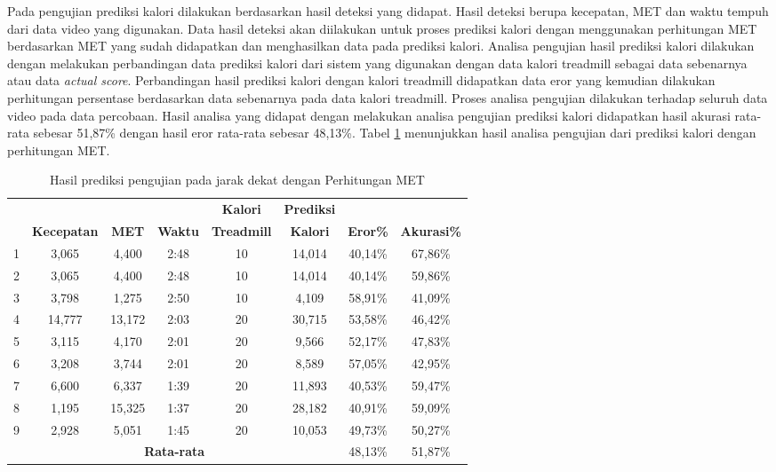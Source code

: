 Pada pengujian prediksi kalori dilakukan berdasarkan hasil deteksi yang didapat. Hasil deteksi berupa kecepatan, MET dan waktu tempuh dari data video yang digunakan. Data hasil deteksi akan diilakukan untuk proses prediksi kalori dengan menggunakan perhitungan MET berdasarkan MET yang sudah didapatkan dan menghasilkan data pada prediksi kalori. Analisa pengujian hasil prediksi kalori dilakukan dengan melakukan perbandingan data prediksi kalori dari sistem yang digunakan dengan data kalori treadmill sebagai data sebenarnya atau data \emph{actual score}. Perbandingan hasil prediksi kalori dengan kalori treadmill didapatkan data eror yang kemudian dilakukan perhitungan persentase berdasarkan data sebenarnya pada data kalori treadmill. Proses analisa pengujian dilakukan terhadap seluruh data video pada data percobaan. Hasil analisa yang didapat dengan melakukan analisa pengujian prediksi kalori didapatkan hasil akurasi rata-rata sebesar 51,87\% dengan hasil eror rata-rata sebesar 48,13\%. Tabel \ref{tb:PengujianJarakDekatAnalisaPrediksiPerhitungan} menunjukkan hasil analisa pengujian dari prediksi kalori dengan perhitungan MET.

\begin{longtable}{|c|c|c|c|c|c|c|c|}
  \caption{Hasil prediksi pengujian pada jarak dekat dengan Perhitungan MET}
  \label{tb:PengujianJarakDekatAnalisaPrediksiPerhitungan}                                   \\
  \hline
  \rowcolor[HTML]{C0C0C0}
  & & & & \textbf{Kalori} & \textbf{Prediksi} & & \\
  \rowcolor[HTML]{C0C0C0}
  \multirow{-2}{*}{\textbf{Percobaan}} & \multirow{-2}{*}{\textbf{Kecepatan}} & \multirow{-2}{*}{\textbf{MET}} & \multirow{-2}{*}{\textbf{Waktu}} & \textbf{Treadmill} & \textbf{Kalori} & \multirow{-2}{*}{\textbf{Eror\%}} & \multirow{-2}{*}{\textbf{Akurasi\%}} \\
  \hline
  1   & 3,065   & 4,400    & 2:48    & 10   & 14,014   & 40,14\%     & 67,86\%   \\
  \hline
  2   & 3,065   & 4,400    & 2:48    & 10   & 14,014   & 40,14\%     & 59,86\%   \\
  \hline
  3   & 3,798   & 1,275    & 2:50    & 10   & 4,109    & 58,91\%     & 41,09\%   \\
  \hline
  4   & 14,777  & 13,172   & 2:03    & 20   & 30,715   & 53,58\%      & 46,42\%   \\
  \hline
  5   & 3,115   & 4,170    & 2:01    & 20   & 9,566    & 52,17\%     & 47,83\%   \\
  \hline
  6   & 3,208   & 3,744    & 2:01    & 20   & 8,589    & 57,05\%      & 42,95\%   \\
  \hline
  7   & 6,600   & 6,337    & 1:39    & 20    & 11,893  & 40,53\%      & 59,47\%   \\
  \hline
  8   & 1,195   & 15,325   & 1:37    & 20    & 28,182  & 40,91\%      & 59,09\%   \\
  \hline
  9   & 2,928   & 5,051    & 1:45    & 20    & 10,053  & 49,73\%      & 50,27\%   \\
  \hline

  \multicolumn{6}{|c|}{\textbf{Rata-rata}} & 48,13\% & 51,87\%  \\
  \hline
\end{longtable}


